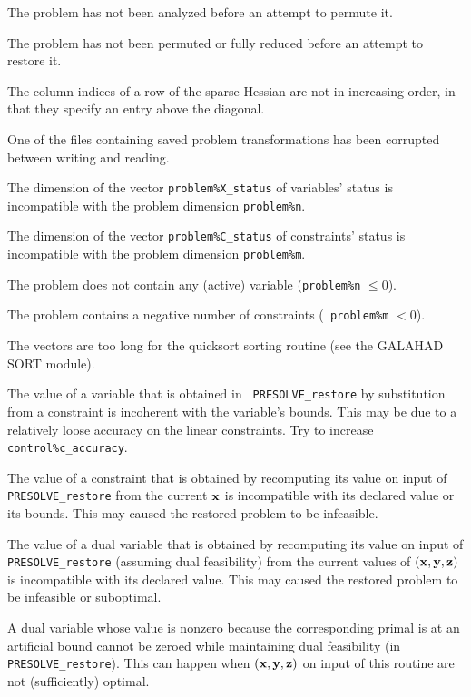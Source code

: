 \documentclass{galahad}
\newcommand{\packagename}{PRESOLVE}
\begin{document}
\begin{description}
 The problem has not been analyzed before an attempt to permute it.

 The problem has not been permuted or fully reduced 
before an attempt to restore it.

 The column indices of a row of the sparse Hessian are 
not in increasing order, in that they specify an entry above the diagonal.

 One of the files containing saved problem transformations has been
corrupted between  writing and reading.

 The dimension of the vector {\tt problem\%X\_status} of
variables' status is incompatible with the problem dimension {\tt problem\%n}.

 The dimension of the vector {\tt problem\%C\_status} of 
constraints' status is incompatible with the problem dimension
{\tt problem\%m}.

 The problem does not contain any (active) variable ({\tt problem\%n}
$\leq 0$).

 The problem contains a negative number of constraints ({\tt
problem\%m} $< 0$).

 The vectors are too long for the quicksort sorting routine (see the
GALAHAD SORT module).

 The value of a variable that is obtained in {\tt
\packagename\_restore} by substitution from a constraint is incoherent with
the variable's bounds.  This may be due to a relatively loose accuracy on the
linear constraints. Try to increase {\tt control\%c\_accuracy}.

 The value of a constraint that is obtained by
recomputing its value on input of {\tt \packagename\_restore} from the
current ${\mathbf{x}}$ is incompatible with its declared value
or its bounds. This may caused the restored problem to be infeasible.

 The value of a dual variable that is obtained by
recomputing its value on input of {\tt \packagename\_restore} (assuming
dual feasibility) from the current values of $( {\mathbf{x}}, {\mathbf{y}}, {\mathbf{z}} )$ is
incompatible with its declared value. This may caused the restored problem to
be infeasible or suboptimal.

 A dual variable whose value is nonzero because the
corresponding primal is at an artificial bound cannot
be zeroed while maintaining dual feasibility 
(in {\tt \packagename\_restore}). This can happen when $( {\mathbf{x}}, {\mathbf{y}}, {\mathbf{z}} )$
on  input of this routine are not (sufficiently) optimal.


\end{description}
\end{document}
